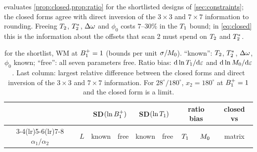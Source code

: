 evaluates \cref{prop:closed,prop:ratio} for the shortlisted designs of
\cref{sec:constraints}; the closed forms agree with direct inversion of the $3\times3$ and $7\times7$
information to rounding. Freeing $T_2$, $T_2^{*}$, $\Delta\omega$ and $\phi_0$ costs $7$--$30\%$ in the $T_1$ bound; in
\eqref{eq:closed} this is the information about the offsets that scan 2 must spend on $T_2$ and $T_2^{*}$.

\begin{table}[!htbp]
\centering
\caption{ for the shortlist, WM at $B_1^{+}=1$ (bounds per unit $\sigma/M_0$).
``known'': $T_2$, $T_2^{*}$, $\Delta\omega$, $\phi_0$ known; ``free'': all seven parameters free. Ratio bias: $\mathrm d\ln T_1/\mathrm d\varepsilon$
and $\mathrm d\ln M_0/\mathrm d\varepsilon$. Last column: largest relative difference between the closed forms and direct
inversion of the $3\times3$ and $7\times7$ information. For $28^\circ/180^\circ$, $x_2=180^\circ$ at $B_1^{+}=1$ and the closed form is a limit.}
\label{tab:reduced}
\small\setlength{\tabcolsep}{4pt}
\begin{tabular}{ccccccccc}
\toprule
& & \multicolumn{2}{c}{SD$(\ln B_1^{+})$} & \multicolumn{2}{c}{SD$(\ln T_1)$} & \multicolumn{2}{c}{ratio bias} & closed vs\\
\cmidrule(lr){3-4}\cmidrule(lr){5-6}\cmidrule(lr){7-8}
$\alpha_1/\alpha_2$ & $L$ & known & free & known & free & $T_1$ & $M_0$ & matrix\\
\midrule

\bottomrule
\end{tabular}
\end{table}
